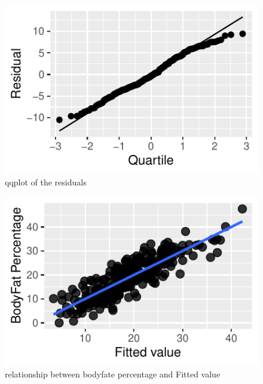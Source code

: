 \documentclass[letterpaper,9pt,twocolumn,twoside,]{pinp}
\begin{document}
\begin{figure}[!h]

{\centering \includegraphics{Report_012E01_files/figure-latex/unnamed-chunk-1-1} 

}

\caption{qqplot of the residuals}\label{fig:unnamed-chunk-1}
\end{figure}

\begin{figure}[!h]

{\centering \includegraphics{Report_012E01_files/figure-latex/unnamed-chunk-2-1} 

}

\caption{relationship between bodyfate percentage and Fitted value}\label{fig:unnamed-chunk-2}
\end{figure}
\end{document}
